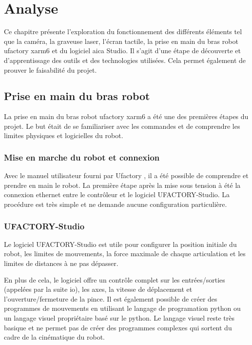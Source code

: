 \chapter{Analyse}
\label{chap:analyse}

Ce chapitre présente l'exploration du fonctionnement des différents éléments tel que la caméra, la graveuse laser, l'écran tactile, la prise en main du bras robot \gls{ufactory} \gls{xarm6} et du logiciel \gls{aica} Studio. Il s'agit d'une étape de découverte et d'apprentissage des outils et des technologies utilisées. Cela permet également de prouver le faisabilité du projet.

\section{Prise en main du bras robot}
La prise en main du bras robot \gls{ufactory} \gls{xarm6} a été une des premières étapes du projet. Le but était de se familiariser avec les commandes et de comprendre les limites physiques et logicielles du robot.

\subsection{Mise en marche du robot et connexion}
Avec le manuel utilisateur fourni par Ufactory \cite{UserManual}, il a été possible de comprendre et prendre en main le robot. La première étape après la mise sous tension à été la connexion ethernet entre le contrôleur et le logiciel UFACTORY-Studio. La procédure est très simple et ne demande aucune configuration particulière.

\subsection{UFACTORY-Studio}
Le logiciel UFACTORY-Studio est utile pour configurer la position initiale du robot, les limites de mouvements, la force maximale de chaque articulation et les limites de distances à ne pas dépasser.

En plus de cela, le logiciel offre un contrôle complet sur les entrées/sorties (appelées par la suite \gls{io}), les axes, la vitesse de déplacement et l'ouverture/fermeture de la pince. Il est également possible de créer des programmes de mouvements en utilisant le langage  de programation \gls{python} ou un langage visuel propriétaire basé sur le \gls{python}. Le langage visuel reste très basique et ne permet pas de créer des programmes complexes qui sortent du cadre de la cinématique du robot.

